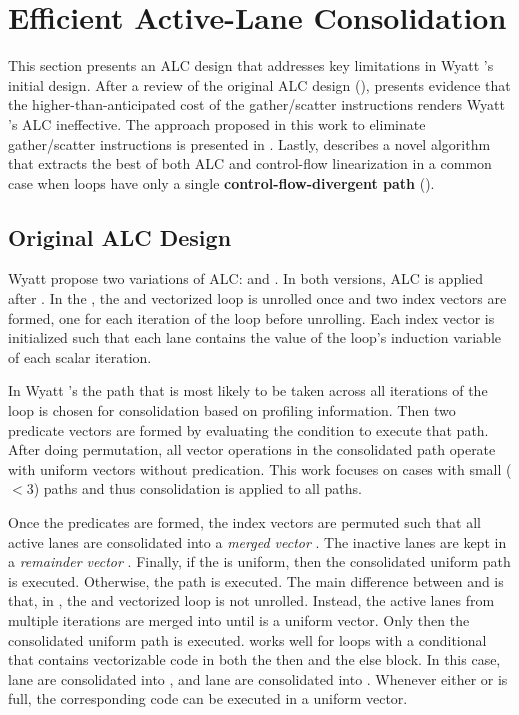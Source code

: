 \section{Efficient Active-Lane Consolidation}
\label{sec:approach}

This section presents an ALC design that addresses key limitations in Wyatt \etal's initial design\cite{praharenka_vectorizing_2022}. After a review of the original ALC design (),  presents evidence that the higher-than-anticipated cost of the gather/scatter instructions renders Wyatt \etal's ALC ineffective.
The approach proposed in this work to eliminate gather/scatter instructions is presented in .
Lastly,  describes a novel algorithm that extracts the best of both ALC and control-flow linearization in a common case when loops have only a single \textbf{control-flow-divergent path} (\cpath).

\subsection{Original ALC Design}
\label{sec:original-alc}

Wyatt \etal propose two variations of ALC: \unrollALC and \iterALC.
In both versions, ALC is applied after \ifconversion.
In the \unrollALC, the \ifconverted and vectorized loop is unrolled once and two index vectors are formed, one for each iteration of the loop before unrolling.
Each index vector is initialized such that each lane contains the value of the loop's induction variable of each scalar iteration.

In Wyatt \etal's the path that is most likely to be taken across all iterations of the loop is chosen for consolidation based on profiling information.
Then two predicate vectors are formed by evaluating the condition to execute that path. After doing permutation, all vector operations in the consolidated path operate with uniform vectors without predication.
This work focuses on cases with small ($< 3$) paths and thus consolidation is applied to all paths.

Once the predicates are formed, the index vectors are permuted such that all active lanes are consolidated into a \emph{merged vector} \vM.
The inactive lanes are kept in a \emph{remainder vector} \vR.
Finally, if the \vM is uniform, then the consolidated uniform path is executed.
Otherwise, the \ifconverted path is executed.
The main difference between \unrollALC and \iterALC is that, in \iterALC, the \ifconverted and vectorized loop is not unrolled.
Instead, the active lanes from multiple iterations are merged into \vM until \vM is a uniform vector. 
Only then the consolidated uniform path is executed.
\iterALC works well for loops with a conditional that contains vectorizable code in both the then and the else block.
In this case,  lane are consolidated into \vM, and  lane are consolidated into \vR.
Whenever either \vM or \vR is full, the corresponding code can be executed in a uniform vector.

